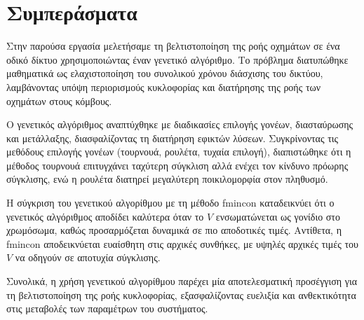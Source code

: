\documentclass[a4paper,12pt]{article}
\begin{document}
\section*{Συμπεράσματα}

Στην παρούσα εργασία μελετήσαμε τη βελτιστοποίηση της ροής οχημάτων σε ένα οδικό δίκτυο χρησιμοποιώντας έναν 
γενετικό αλγόριθμο. Το πρόβλημα διατυπώθηκε μαθηματικά ως ελαχιστοποίηση του συνολικού χρόνου διάσχισης του 
δικτύου, λαμβάνοντας υπόψη περιορισμούς κυκλοφορίας και διατήρησης της ροής των οχημάτων στους κόμβους.

Ο γενετικός αλγόριθμος αναπτύχθηκε με διαδικασίες επιλογής γονέων, διασταύρωσης και μετάλλαξης, διασφαλίζοντας 
τη διατήρηση εφικτών λύσεων. Συγκρίνοντας τις μεθόδους επιλογής γονέων (τουρνουά, ρουλέτα, τυχαία επιλογή), 
διαπιστώθηκε ότι η μέθοδος τουρνουά επιτυγχάνει ταχύτερη σύγκλιση αλλά ενέχει τον κίνδυνο πρόωρης σύγκλισης,
ενώ η ρουλέτα διατηρεί μεγαλύτερη ποικιλομορφία στον πληθυσμό. 

Η σύγκριση του γενετικού αλγορίθμου
με τη μέθοδο fmincon καταδεικνύει ότι ο γενετικός αλγόριθμος αποδίδει
καλύτερα όταν το $V$ ενσωματώνεται ως γονίδιο στο χρωμόσωμα, καθώς προσαρμόζεται δυναμικά σε πιο αποδοτικές 
τιμές. Αντίθετα, η fmincon αποδεικνύεται ευαίσθητη στις αρχικές 
συνθήκες, με υψηλές αρχικές τιμές του $V$ να οδηγούν σε αποτυχία σύγκλισης. 

Συνολικά, η χρήση γενετικού 
αλγορίθμου παρέχει μία αποτελεσματική προσέγγιση για τη βελτιστοποίηση της ροής κυκλοφορίας, εξασφαλίζοντας ευελιξία
και ανθεκτικότητα στις μεταβολές των παραμέτρων του συστήματος.
\end{document}

